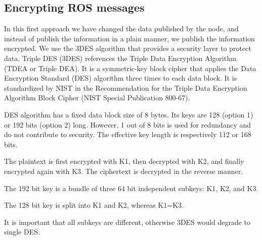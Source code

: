 \documentclass[journal,twoside]{JoPhA}
\begin{document}



\subsection{Encrypting ROS messages}



In this first approach we have changed the data published by the node, and instead of publish the information in a plain manner, we publish the information encrypted. We use the 3DES algorithm that provides a security layer to protect data.
Triple DES (3DES) references the Triple Data Encryption Algorithm (TDEA or Triple DEA). It is a symmetric-key block cipher that applies the Data Encryption Standard (DES) algorithm three times to each data block. It is standardized by NIST in the Recommendation for the Triple Data Encryption Algorithm Block Cipher (NIST Special Publication 800-67).

DES algorithm has a fixed data block size of 8 bytes. Its keys are 128 (option 1) or 192 bits (option 2) long. However, 1 out of 8 bits is used for redundancy and do not contribute to security. The effective key length is respectively 112 or 168 bits.

The plaintext is first encrypted with K1, then decrypted with K2, and finally encrypted again with K3. The ciphertext is decrypted in the reverse manner.

The 192 bit key is a bundle of three 64 bit independent subkeys: K1, K2, and K3.

The 128 bit key is split into K1 and K2, whereas K1=K3.

It is important that all subkeys are different, otherwise 3DES would degrade to single DES.
\end{document}

